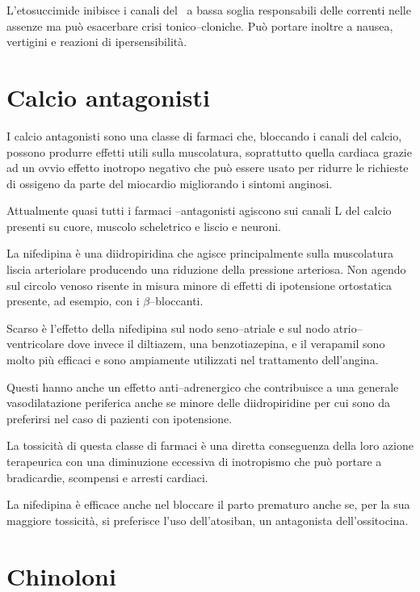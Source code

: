 L'etosuccimide inibisce i canali del~ a bassa soglia responsabili delle correnti nelle assenze ma può esacerbare crisi tonico--cloniche. Può portare inoltre a nausea, vertigini e reazioni di ipersensibilità.

\section{Calcio antagonisti}

I calcio antagonisti sono una classe di farmaci che, bloccando i canali del calcio, possono produrre effetti utili sulla muscolatura, soprattutto quella cardiaca grazie ad un ovvio effetto inotropo negativo che può essere usato per ridurre le richieste di ossigeno da parte del miocardio migliorando i sintomi anginosi.

Attualmente quasi tutti i farmaci --antagonisti agiscono sui canali L del calcio presenti su cuore, muscolo scheletrico e liscio e neuroni.

La nifedipina è una diidropiridina che agisce principalmente sulla muscolatura liscia arteriolare producendo una riduzione della pressione arteriosa. Non agendo sul circolo venoso risente in misura minore di effetti di ipotensione ortostatica presente, ad esempio, con i $\beta$--bloccanti. 

Scarso è l'effetto della nifedipina sul nodo seno--atriale e sul nodo atrio--ventricolare dove invece il diltiazem, una benzotiazepina, e il verapamil sono molto più efficaci e sono ampiamente utilizzati nel trattamento dell'angina.

Questi hanno anche un effetto anti--adrenergico che contribuisce a una generale vasodilatazione periferica anche se minore delle diidropiridine per cui sono da preferirsi nel caso di pazienti con ipotensione.

La tossicità di questa classe di farmaci è una diretta conseguenza della loro azione terapeurica con una diminuzione eccessiva di inotropismo che può portare a bradicardie, scompensi e arresti cardiaci.

La nifedipina è efficace anche nel bloccare il parto prematuro anche se, per la sua maggiore tossicità, si preferisce l'uso dell'atosiban, un antagonista dell'ossitocina.

\section{Chinoloni}

